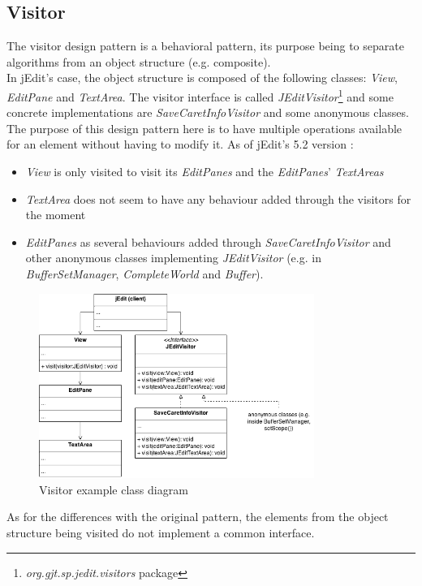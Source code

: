 \subsection{Visitor}
The visitor design pattern is a behavioral pattern, its purpose being to
separate algorithms from an object structure (e.g. composite).\\

In jEdit's case, the object structure is composed of the following classes:
\emph{View}, \emph{EditPane} and \emph{TextArea}.
The visitor interface is called
\emph{JEditVisitor}\footnote{\emph{org.gjt.sp.jedit.visitors} package} and some
concrete implementations are \emph{SaveCaretInfoVisitor} and some anonymous
classes. The purpose of this design pattern here is to have multiple operations
available for an element without having to modify it. As of jEdit's 5.2 version :

\begin{itemize}\itemsep1pt
    \item  \emph{View} is only visited to visit its \emph{EditPanes} and the
    \emph{EditPanes}' \emph{TextAreas}
    \item \emph{TextArea} does not seem to have any behaviour added through the visitors for the moment
    \item \emph{EditPanes} as several behaviours added through
    \emph{SaveCaretInfoVisitor} and other anonymous classes implementing
    \emph{JEditVisitor} (e.g. in \emph{BufferSetManager}, \emph{CompleteWorld}
    and \emph{Buffer}).
\end{itemize}

\begin{figure}[h!]
    \includegraphics[width=0.8\textwidth]{images/visitor.png}
    \centering
    \caption{Visitor example class diagram}
\end{figure}

As for the differences with the original pattern, the elements from the object structure being visited do not implement a common interface.
\newpage
